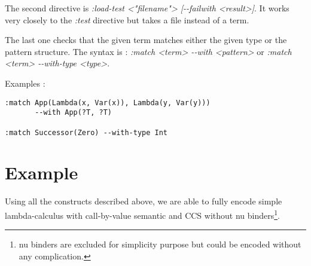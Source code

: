 \documentclass[12pt,a4paper]{article}
\begin{document}
The second directive is \emph{:load-test <"filename"> [-{}-failwith
  <result>]}. It works very closely to the \emph{:test} directive but
takes a file instead of a term.

The last one checks that the given term matches either the given type
or the pattern structure. The syntax is : \emph{:match <term> -{}-with
  <pattern>} or \emph{:match <term> -{}-with-type <type>}.

Examples : 
\begin{verbatim}
:match App(Lambda(x, Var(x)), Lambda(y, Var(y))) 
       --with App(?T, ?T) 

:match Successor(Zero) --with-type Int
\end{verbatim}


\section{Example}
Using all the constructs described above, we are able to fully encode simple 
lambda-calculus with call-by-value semantic and CCS without nu binders\footnote{nu 
binders are excluded for simplicity purpose but could be encoded without any 
complication.}.
\end{document}
